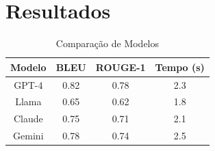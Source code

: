 \documentclass[conference]{IEEEtran}
\begin{document}
\section{Resultados}
\begin{table}[!t]
\caption{Comparação de Modelos}
\label{table_results}
\centering
\begin{tabular}{|c|c|c|c|}
\hline
Modelo & BLEU & ROUGE-1 & Tempo (s)\\
\hline
GPT-4 & 0.82 & 0.78 & 2.3\\
Llama & 0.65 & 0.62 & 1.8\\
Claude & 0.75 & 0.71 & 2.1\\
Gemini & 0.78 & 0.74 & 2.5\\
\hline
\end{tabular}
\end{table}

\balance


\end{document}
